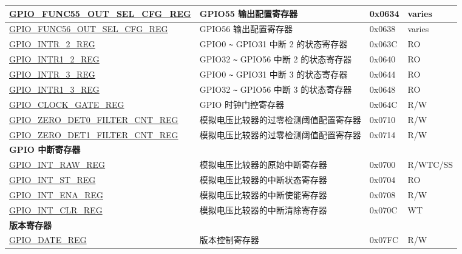\begin{longtable}{ | p{5.8cm} | p{7.2cm} | p{1.3cm} | p{2.2cm} | }
\hyperref[regdesc:GPIOFUNCNOUTSELCFGREG]{GPIO\_FUNC55\_OUT\_SEL\_CFG\_REG} & GPIO55 输出配置寄存器 & 0x0634 & varies \\ \hline
\hyperref[regdesc:GPIOFUNCNOUTSELCFGREG]{GPIO\_FUNC56\_OUT\_SEL\_CFG\_REG} & GPIO56 输出配置寄存器 & 0x0638 & varies \\ \hline
\hyperref[regdesc:GPIOINTR2REG]{GPIO\_INTR\_2\_REG} & GPIO0 \verb+~+ GPIO31 中断 2 的状态寄存器 & 0x063C & RO \\ \hline
\hyperref[regdesc:GPIOINTR12REG]{GPIO\_INTR1\_2\_REG} & GPIO32 \verb+~+ GPIO56 中断 2 的状态寄存器 & 0x0640 & RO \\ \hline
\hyperref[regdesc:GPIOINTR3REG]{GPIO\_INTR\_3\_REG} & GPIO0 \verb+~+ GPIO31 中断 3 的状态寄存器 & 0x0644 & RO \\ \hline
\hyperref[regdesc:GPIOINTR13REG]{GPIO\_INTR1\_3\_REG} & GPIO32 \verb+~+ GPIO56 中断 3 的状态寄存器 & 0x0648 & RO \\ \hline
\hyperref[regdesc:GPIOCLOCKGATEREG]{GPIO\_CLOCK\_GATE\_REG} & GPIO 时钟门控寄存器 & 0x064C & R/W \\ \hline
\hyperref[regdesc:GPIOZERODET0FILTERCNTREG]{GPIO\_ZERO\_DET0\_FILTER\_CNT\_REG} & 模拟电压比较器的过零检测阈值配置寄存器 & 0x0710 & R/W \\ \hline
\hyperref[regdesc:GPIOZERODET1FILTERCNTREG]{GPIO\_ZERO\_DET1\_FILTER\_CNT\_REG} & 模拟电压比较器的过零检测阈值配置寄存器& 0x0714 & R/W \\ \hline
\multicolumn{4}{|l|}{\textbf{GPIO 中断寄存器}} \\ \hline
\hyperref[regdesc:GPIOINTRAWREG]{GPIO\_INT\_RAW\_REG} & 模拟电压比较器的原始中断寄存器 & 0x0700 & R/WTC/SS \\ \hline
\hyperref[regdesc:GPIOINTSTREG]{GPIO\_INT\_ST\_REG} & 模拟电压比较器的中断状态寄存器& 0x0704 & RO \\ \hline
\hyperref[regdesc:GPIOINTENAREG]{GPIO\_INT\_ENA\_REG} & 模拟电压比较器的中断使能寄存器& 0x0708 & R/W \\ \hline
\hyperref[regdesc:GPIOINTCLRREG]{GPIO\_INT\_CLR\_REG} & 模拟电压比较器的中断清除寄存器 & 0x070C & WT \\ \hline
\multicolumn{4}{|l|}{\textbf{版本寄存器}} \\ \hline
\hyperref[regdesc:GPIODATEREG]{GPIO\_DATE\_REG} & 版本控制寄存器 & 0x07FC & R/W \\ \hline
\end{longtable}
